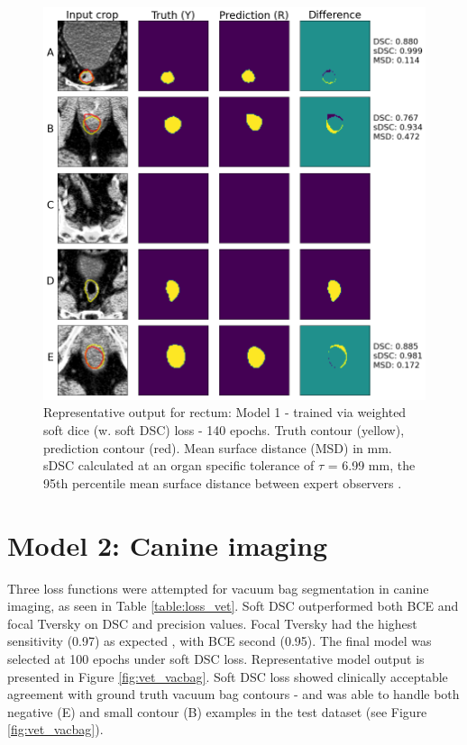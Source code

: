 \begin{figure}[H]
	\begin{center}
		\includegraphics[width=1.0\textwidth]{figures/prostate_rectum}
		\caption{Representative output for rectum: Model 1 - trained via weighted soft dice (w. soft DSC) loss - 140 epochs. Truth contour (yellow), prediction contour (red). Mean surface distance (MSD) in mm. sDSC \cite{Nikolov_2018} calculated at an organ specific tolerance of $\tau$ = 6.99 mm, the 95th percentile mean surface distance between expert observers \cite{Roach_2019}.}
		\label{fig:prostate_rectum}
	\end{center}
\end{figure}

\section{Model 2: Canine imaging}

Three loss functions were attempted for vacuum bag segmentation in canine imaging, as seen in Table \ref{table:loss_vet}. Soft DSC outperformed both BCE and focal Tversky on DSC and precision values. Focal Tversky had the highest sensitivity (0.97) as expected \cite{Khan2019}, with BCE second (0.95). The final model was selected at 100 epochs under soft DSC loss. Representative model output is presented in Figure \ref{fig:vet_vacbag}. Soft DSC loss showed clinically acceptable agreement with ground truth vacuum bag contours - and was able to handle both negative (E) and small contour (B) examples in the test dataset (see Figure \ref{fig:vet_vacbag}).

